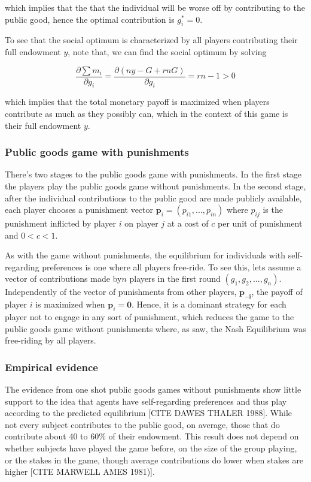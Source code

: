 \message{ !name(tese.tex)}\documentclass{article}
\begin{document}
which implies that the that the individual will be worse off by contributing to the public good, hence the optimal contribution is $g_i^* = 0$.

To see that the social optimum is characterized by all players contributing their full endowment $y$, note that, we can find the social optimum by solving 

\begin{equation}
\frac{\partial \sum m_i}{\partial g_i} = \frac{\partial \left( ny-G+rnG\right)}{\partial g_i} = rn-1>0 
\end{equation}

which implies that the total monetary payoff is maximized when players contribute as much as they possibly can, which in the context of this game is their full endowment $y$.

\subsubsection{Public goods game with punishments}

There's two stages to the public goods game with punishments. In the first stage the players play the public goods game without punishments. In the second stage, after the individual contributions to the public good are made publicly available, each player chooses a punishment vector $\bm{p}_i = \left( p_{i1},...,p_{in}\right)$ where $p_{ij}$ is the punishment inflicted by player $i$ on player $j$ at a cost of $c$ per unit of punishment and $0<c<1$. 

As with the game without punishments, the equilibrium for individuals with self-regarding preferences is one where all players free-ride. To see this, lets assume a vector of contributions made by$n$ players in the first round $\left(g_1,g_2,...,g_n\right)$. Independently of the vector of punishments from other players, $\pmb{p_{-i}}$, the payoff of player $i$ is maximized when $\pmb{p}_i = \pmb{0}$. Hence, it is a dominant strategy for each player not to engage in any sort of punishment, which reduces the game to the public goods game without punishments where, as saw, the Nash Equilibrium was free-riding by all players.

\subsubsection{Empirical evidence}

The evidence from one shot public goods games without punishments show little support to the idea that agents have self-regarding preferences and thus play according to the predicted equilibrium [CITE DAWES THALER 1988]. While not every subject contributes to the public good, on average, those that do contribute about 40 to 60\% of their endowment. This result does not depend on whether subjects have played the game before, on the size of the group playing, or the stakes in the game, though average contributions do lower when stakes are higher [CITE MARWELL AMES 1981)].
\end{document}
